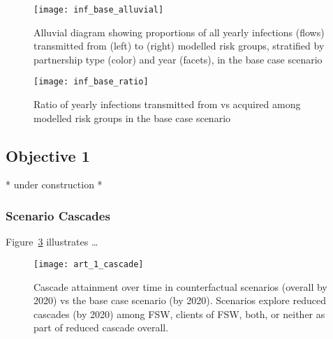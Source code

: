 \begin{figure}[h]
  \texttt{[image: inf\_base\_alluvial]}
  \caption{Alluvial diagram showing proportions of all yearly infections (flows)
    transmitted from (left) to (right) modelled risk groups,
    stratified by partnership type (color) and year (facets),
    in the base case scenario}
  \label{fig:inf.alluvial}
\end{figure}
\begin{figure}[h]
  \centering
  \texttt{[image: inf\_base\_ratio]}
  \caption{Ratio of yearly infections transmitted from vs acquired among modelled risk groups
    in the base case scenario}
  \label{fig:inf.ratio}
\end{figure}
\clearpage
\subsection{Objective 1}\label{a:res.1}
* under construction *
\subsubsection{Scenario Cascades}
Figure~\ref{fig:obj.1.cascade} illustrates \dots
\begin{figure}[h]
  \centering
  \texttt{[image: art\_1\_cascade]}
  \caption{Cascade attainment over time in counterfactual scenarios (\casmid overall by 2020)
    vs the base case scenario (\cashigh by 2020).
    Scenarios explore reduced cascades (\caslow by 2020) among FSW, clients of FSW, both, or neither
    as part of reduced cascade overall.}
  \label{fig:obj.1.cascade}
\end{figure}
\clearpage
